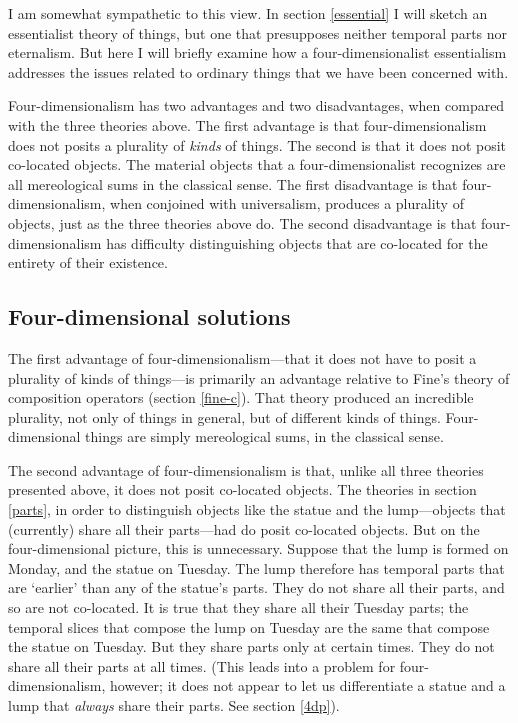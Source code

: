 \documentclass[11pt]{article}
\begin{document}
\begin{spacing}{1.5}
I am somewhat sympathetic to this view.  In section \ref{essential} I
will sketch an essentialist theory of things, but one that presupposes
neither temporal parts nor eternalism.  But here I will briefly
examine how a four-dimensionalist essentialism addresses the issues
related to ordinary things that we have been concerned with.

Four-dimensionalism has two advantages and two disadvantages, when
compared with the three theories above.  The first advantage is that
four-dimensionalism does not posits a plurality of {\em kinds} of
things.  The second is that it does not posit co-located objects.  The
material objects that a four-dimensionalist recognizes are all
mereological sums in the classical sense.  The first disadvantage is
that four-dimensionalism, when conjoined with universalism, produces a
plurality of objects, just as the three theories above do.  The second
disadvantage is that four-dimensionalism has difficulty distinguishing
objects that are co-located for the entirety of their existence.

\subsection{Four-dimensional solutions}
\label{4ds}
The first advantage of four-dimensionalism---that it does not have to posit
a plurality of kinds of things---is primarily an advantage relative to
Fine's theory of composition operators (section \ref{fine-c}).  That
theory produced an incredible plurality, not only of things in
general, but of different kinds of things.  Four-dimensional things
are simply mereological sums, in the classical sense.

The second advantage of four-dimensionalism is that, unlike all three
theories presented above, it does not posit co-located objects.  The
theories in section \ref{parts}, in order to distinguish objects like
the statue and the lump---objects that (currently) share all their
parts---had do posit co-located objects.  But on the four-dimensional
picture, this is unnecessary.  Suppose that the lump is formed on
Monday, and the statue on Tuesday.  The lump therefore has temporal
parts that are `earlier' than any of the statue's parts.  They do not
share all their parts, and so are not co-located.  It is true that
they share all their Tuesday parts; the temporal slices that compose
the lump on Tuesday are the same that compose the statue on Tuesday.
But they share parts only at certain times.  They do not share all
their parts at all times.  (This leads into a problem for
four-dimensionalism, however; it does not appear to let us
differentiate a statue and a lump that {\em always} share their parts.
See section \ref{4dp}).


\end{spacing}
\end{document}
